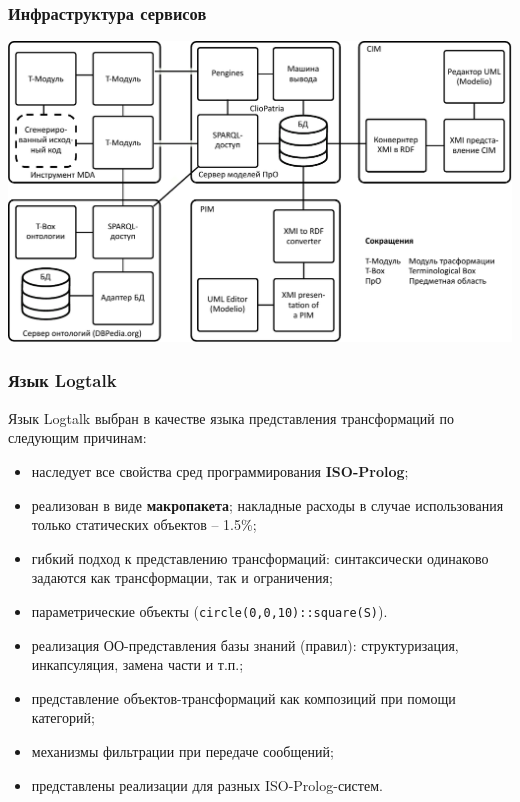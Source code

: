 \documentclass[10pt]{beamer}
\begin{document}
\begin{frame}
  \frametitle{Инфраструктура сервисов}
  \centering
  \includegraphics[width=1\linewidth]{architecture-mda-lod-ext-ru.pdf}
\end{frame}
\begin{frame}
  \frametitle{Язык Logtalk}
  Язык Logtalk выбран в качестве языка представления трансформаций по следующим причинам:
  \begin{itemize}
  \item наследует все свойства сред программирования \textbf{ISO-Prolog};
  \item реализован в виде \textbf{макропакета}; накладные расходы в случае использования только статических объектов -- 1.5\%;
  \item гибкий подход к представлению трансформаций: синтаксически одинаково задаются как трансформации, так и ограничения;
  \item параметрические объекты (\texttt{circle(0,0,10)::square(S)}).
  \item реализация ОО-представления базы знаний (правил): структуризация, инкапсуляция, замена части и т.п.;
  \item представление объектов-трансформаций как композиций при помощи категорий;
  \item механизмы фильтрации при передаче сообщений;
  \item представлены реализации для разных ISO-Prolog-систем.
  \end{itemize}
\end{frame}
\end{document}
